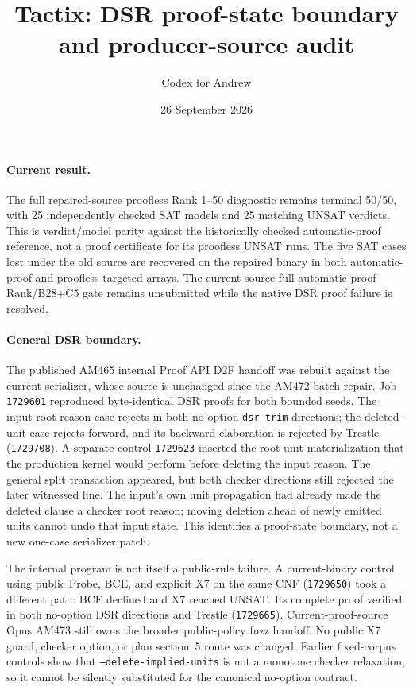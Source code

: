 \documentclass[11pt]{article}
\title{Tactix: DSR proof-state boundary and producer-source audit}
\author{Codex for Andrew}
\date{26 September 2026}
\begin{document}
\maketitle

\paragraph{Current result.}
The full repaired-source proofless Rank 1--50 diagnostic remains terminal
50/50, with 25 independently checked SAT models and 25 matching UNSAT
verdicts. This is verdict/model parity against the historically checked
automatic-proof reference, not a proof certificate for its proofless UNSAT
runs. The five SAT cases lost under the old source are recovered on the
repaired binary in both automatic-proof and proofless targeted arrays. The
current-source full automatic-proof Rank/B28+C5 gate remains unsubmitted
while the native DSR proof failure is resolved.

\paragraph{General DSR boundary.}
The published AM465 internal Proof API D2F handoff was rebuilt against
the current serializer, whose source is unchanged since the AM472 batch
repair. Job \texttt{1729601} reproduced byte-identical DSR proofs for both
bounded seeds. The input-root-reason case rejects in both no-option
\texttt{dsr-trim} directions; the deleted-unit case rejects forward, and its
backward elaboration is rejected by Trestle (\texttt{1729708}). A separate
control \texttt{1729623} inserted the root-unit materialization that the
production kernel would perform before deleting the input reason. The
general split transaction appeared, but both checker directions still
rejected the later witnessed line. The input's own unit propagation had
already made the deleted clause a checker root reason; moving deletion ahead
of newly emitted units cannot undo that input state. This identifies a
proof-state boundary, not a new one-case serializer patch.

The internal program is not itself a public-rule failure. A current-binary
control using public Probe, BCE, and explicit X7 on the same CNF (\texttt{1729650}) took
a different path: BCE declined and X7 reached UNSAT. Its complete proof
verified in both no-option DSR directions and Trestle (\texttt{1729665}).
Current-proof-source Opus AM473 still owns the broader public-policy fuzz
handoff. No public X7 guard, checker option, or plan section~5 route was
changed. Earlier fixed-corpus controls show that
\texttt{--delete-implied-units} is not a monotone checker relaxation, so it
cannot be silently substituted for the canonical no-option contract.
\end{document}
